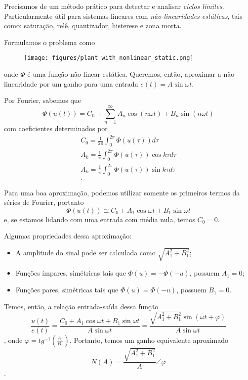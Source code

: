 
Precisamos de um método prático para detectar e analisar \emph{ciclos limites}. Particularmente útil para sistemas lineares com \emph{não-linearidades estáticas}, tais como: saturação, relê, quantizador, histerese e zona morta.

Formulamos o problema como
\begin{figure}[H]
    \centering
    \texttt{[image: figures/plant\_with\_nonlinear\_static.png]}
\end{figure}
onde $\Phi$ é uma função não linear estática. Queremos, então, aproximar a não-linearidade por um ganho para uma entrada $e(t) = A\sin\omega t$.

Por Fourier, sabemos que \[
    \Phi(u(t)) = C_0 + \sum_{n=1}^{\infty} A_n\cos\left( n\omega t \right) + B_n\sin\left( n\omega t \right) 
\] com coeficientes determinados por
\begin{align*}
    C_0 = \frac{1}{2\pi}\int_0^{2\pi}\Phi\left( u(\tau) \right) d\tau \\
    A_k = \frac{1}{\pi}\int_0^{2\pi}\Phi\left( u(\tau) \right) \cos k\tau d\tau \\
    A_k = \frac{1}{\pi}\int_0^{2\pi}\Phi\left( u(\tau) \right) \sin k\tau d\tau \\
.\end{align*}

Para uma boa aproximação, podemos utilizar somente os primeiros termos da séries de Fourier, portanto \[
\Phi\left( u(t) \right) \cong C_0 + A_1\cos\omega t + B_1\sin\omega t
\] e, se estamos lidando com uma entrada com média nula, temos $C_0 = 0$. 

Algumas propriedades dessa aproximação:
\begin{itemize}
    \item A amplitude do sinal pode ser calculada como $\sqrt{A_1^2 + B_1^2}$;
    \item Funções ímpares, simétricas tais que $\Phi(u) = -\Phi(-u)$, possuem $A_1=0$;
    \item Funções pares, simétricas tais que $\Phi(u) = \Phi(-u)$, possuem $B_1=0$.
\end{itemize}

Temos, então, a relação entrada-saída dessa função \[
    \frac{u(t)}{e(t)} = \frac{C_0 + A_1\cos\omega t + B_1\sin\omega t}{A\sin\omega t} = \frac{\sqrt{A_1^2 + B_1^2} \sin\left( \omega t + \varphi \right) }{A\sin\omega t}
\], onde $\varphi = tg^{-1}\left( \frac{A_1}{B_1} \right) $. Portanto, temos um ganho equivalente aproximado \[
N(A) = \frac{\sqrt{A_1^2 + B_1^2}}{A} \angle \varphi
\].

